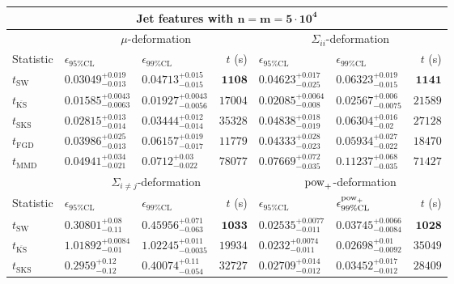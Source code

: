 \begin{tabular}{l|llr|llr}
	\toprule
	\multicolumn{7}{c}{{\bf Jet features with $\mathbf{n=m=5\cdot 10^{4}}$}} \\
	\toprule
	\multicolumn{1}{c}{} & \multicolumn{3}{c}{$\mu$-deformation} & \multicolumn{3}{c}{$\Sigma_{ii}$-deformation} \\
	Statistic & $\epsilon_{95\%\mathrm{CL}}$ & $\epsilon_{99\%\mathrm    {CL}}$ & $t$ (s) & $\epsilon_{95\%\mathrm{CL}}$ & $\epsilon_{99\%\mathrm{CL}}$ & $t$ (s) \\
	\midrule
	$t_{\mathrm{SW}}$ & $0.03049_{-0.013}^{+0.019}$ & $0.04713_{-0.015}^{+0.015}$ & ${\mathbf{1108}}$ & $0.04623_{-0.025}^{+0.017}$ & $0.06323_{-0.015}^{+0.019}$ & ${\mathbf{1141}}$ \\
	$t_{\overline{\mathrm{KS}}}$ & ${\mathbf{0.01585_{-0.0063}^{+0.0043}}}$ & ${\mathbf{0.01927_{-0.0056}^{+0.0043}}}$ & $17004$ & ${\mathbf{0.02085_{-0.008}^{+0.0064}}}$ & ${\mathbf{0.02567_{-0.0075}^{+0.006}}}$ & $21589$ \\
	$t_{\mathrm{SKS}}$ & $0.02815_{-0.014}^{+0.013}$ & $0.03444_{-0.014}^{+0.012}$ & $35328$ & $0.04838_{-0.019}^{+0.018}$ & $0.06304_{-0.02}^{+0.016}$ & $27128$ \\
	$t_{\mathrm{FGD}}$ & $0.03986_{-0.013}^{+0.025}$ & $0.06157_{-0.017}^{+0.019}$ & $11779$ & $0.04333_{-0.023}^{+0.028}$ & $0.05934_{-0.022}^{+0.027}$ & $18470$ \\
	$t_{\mathrm{MMD}}$ & $0.04941_{-0.021}^{+0.034}$ & $0.0712_{-0.022}^{+0.03}$ & $78077$ & $0.07669_{-0.035}^{+0.072}$ & $0.11237_{-0.035}^{+0.068}$ & $71427$ \\
	\toprule
	\multicolumn{1}{c}{} & \multicolumn{3}{c}{$\Sigma_{i\neq j}$-deformation} & \multicolumn{3}{c}{$\rm{pow}_{+}$-deformation} \\
	Statistic & $\epsilon_{95\%\mathrm{CL}}$ & $\epsilon_{99\%\mathrm{CL}}$ & $t$ (s) & $\epsilon_{95\%\mathrm{CL}}$ & $\epsilon^{\rm   {pow}_{+}}_{99\%\mathrm{CL}}$ & $t$ (s) \\
	\midrule
	$t_{\mathrm{SW}}$ & $0.30801_{-0.11}^{+0.08}$ & $0.45956_{-0.063}^{+0.071}$ & ${\mathbf{1033}}$ & $0.02535_{-0.011}^{+0.0077}$ & $0.03745_{-0.0084}^{+0.0066}$ & ${\mathbf{1028}}$ \\
	$t_{\overline{\mathrm{KS}}}$ & $1.01892_{-0.01}^{+0.0084}$ & $1.02245_{-0.0035}^{+0.011}$ & $19934$ & ${\mathbf{0.0232_{-0.011}^{+0.0074}}}$ & ${\mathbf{0.02698_{-0.0092}^{+0.01}}}$ & $35049$ \\
	$t_{\mathrm{SKS}}$ & $0.2959_{-0.12}^{+0.12}$ & $0.40074_{-0.054}^{+0.11}$ & $32727$ & $0.02709_{-0.012}^{+0.014}$ & $0.03452_{-0.012}^{+0.017}$ & $28409$ \\

\end{tabular}
